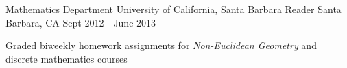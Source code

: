 \begin{cventries}
  \cventry
{Mathematics Department \newline University of California, Santa Barbara}
    {Reader}
    {Santa Barbara, CA}
    {Sept 2012 - June 2013}
    {
      \begin{cvitems}
	\item {Graded biweekly homework assignments for \emph{Non-Euclidean Geometry} and discrete mathematics courses}
      \end{cvitems}
    }



  \end{cventries}
